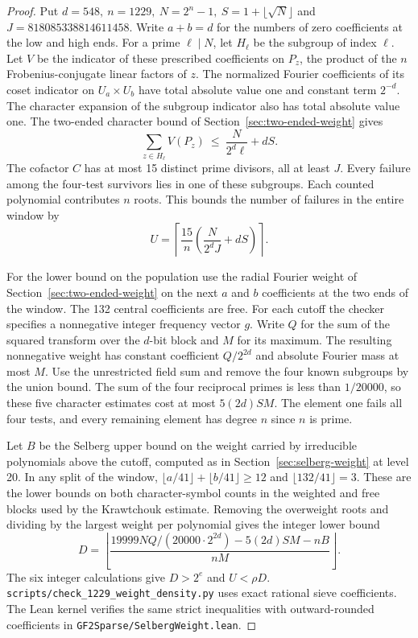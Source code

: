 \documentclass[11pt]{article}
\begin{document}
\begin{proof}
Put \(d=548,\ n=1229,\ N=2^n-1,\ S=1+\lfloor\sqrt N\rfloor\) and
\(J=818085338814611458\). Write \(a+b=d\) for the numbers of zero
coefficients at the low and high ends. For a prime \(\ell\mid N\),
let \(H_\ell\) be the subgroup of index \(\ell\). Let \(V\) be the
indicator of these prescribed coefficients on \(P_z\), the product of
the \(n\) Frobenius-conjugate linear factors of \(z\). The normalized
Fourier coefficients of its coset indicator on \(U_a\times U_b\)
have total absolute value one and constant term \(2^{-d}\).
The character expansion of the subgroup indicator also has total
absolute value one. The two-ended character bound of
Section~\ref{sec:two-ended-weight} gives
\[
  \sum_{z\in H_\ell}V(P_z)\ \le\ \frac{N}{2^d\ell}+dS.
\]
The cofactor \(C\) has at most 15 distinct prime divisors, all at
least \(J\). Every failure among the four-test survivors lies in
one of these subgroups. Each counted polynomial contributes \(n\)
roots. This bounds the number of failures in the entire window by
\[
 U=\left\lceil\frac{15}{n}\left(\frac{N}{2^d J}+dS\right)\right\rceil.
\]

For the lower bound on the population use the radial Fourier weight
of Section~\ref{sec:two-ended-weight} on the next \(a\) and \(b\)
coefficients at the two ends of the window. The 132 central
coefficients are free. For each cutoff the checker specifies a
nonnegative integer frequency vector \(g\). Write \(Q\) for the sum of
the squared transform over the \(d\)-bit block and \(M\) for its maximum.
The resulting nonnegative weight has constant coefficient
\(Q/2^{2d}\) and absolute Fourier mass at most \(M\).
Use the unrestricted field sum and remove the four known subgroups
by the union bound. The sum of the four reciprocal primes is less
than \(1/20000\), so these five character estimates cost at most
\(5(2d)SM\). The element one fails all four tests, and every remaining
element has degree \(n\) since \(n\) is prime.

Let \(B\) be the Selberg upper bound on the weight carried by
irreducible polynomials above the cutoff, computed as in
Section~\ref{sec:selberg-weight} at level 20. In any split of the
window, \(\lfloor a/41\rfloor+\lfloor b/41\rfloor\ge12\) and
\(\lfloor132/41\rfloor=3\). These are the lower bounds on both
character-symbol counts in the weighted and free blocks used by the
Krawtchouk estimate. Removing the overweight roots and dividing by
the largest weight per polynomial gives the integer lower bound
\[
 D=\left\lfloor\frac{19999NQ/(20000\cdot2^{2d})-5(2d)SM-nB}{nM}\right\rfloor .
\]
The six integer calculations give \(D>2^e\) and \(U<\rho D\).
\nolinkurl{scripts/check_1229_weight_density.py} uses exact rational
sieve coefficients. The Lean kernel verifies the same strict inequalities
with outward-rounded coefficients in \nolinkurl{GF2Sparse/SelbergWeight.lean}.
\end{proof}
\end{document}
